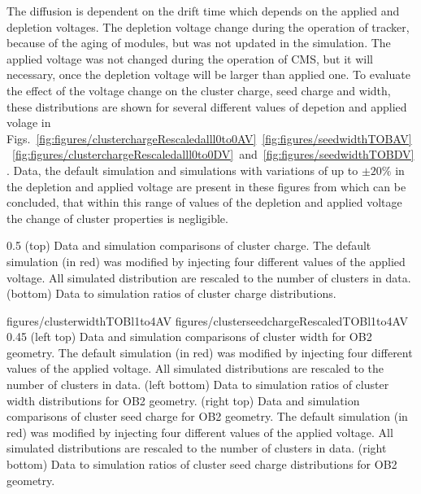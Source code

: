 The diffusion is dependent on the drift time which depends on the applied and depletion voltages. The depletion voltage change during the operation of tracker, because of the aging of modules, but was not updated in the simulation. The applied voltage was not changed during the operation of CMS, but it will necessary, once the depletion voltage will be larger than applied one. To evaluate the effect of the voltage change on the cluster charge, seed charge and width, these distributions are shown for several different values of depetion and applied volage in Figs.~\ref{fig:figures/clusterchargeRescaledalll0to0AV}~\ref{fig:figures/seedwidthTOBAV}~\ref{fig:figures/clusterchargeRescaledalll0to0DV}~and~\ref{fig:figures/seedwidthTOBDV}. Data, the default simulation and simulations with variations of up to $\pm 20\%$ in the depletion and applied voltage are present in these figures from which can be concluded, that within this range of values of the depletion and applied voltage the change of cluster properties is negligible.

                 {0.5}       %
                 { (top) Data and simulation comparisons of cluster charge. The default simulation (in red) was modified by injecting four different values of the applied voltage. All simulated distribution are rescaled to the number of clusters in data. (bottom) Data to simulation ratios of cluster charge distributions. }

                 {figures/clusterwidthTOBl1to4AV}
                 {figures/clusterseedchargeRescaledTOBl1to4AV} %
                 {0.45}       %
                 {(left top) Data and simulation  comparisons of cluster width for OB2 geometry. The default simulation (in red) was modified by injecting four different values of the applied voltage. All simulated distributions are rescaled to the number of clusters in data. (left bottom) Data to simulation ratios of cluster width distributions for OB2 geometry. (right top) Data and simulation  comparisons of cluster seed charge for OB2 geometry. The default simulation (in red) was modified by injecting four different values of the applied voltage. All simulated distributions are rescaled to the number of clusters in data. (right bottom) Data to simulation ratios of cluster seed charge distributions for OB2 geometry. }


